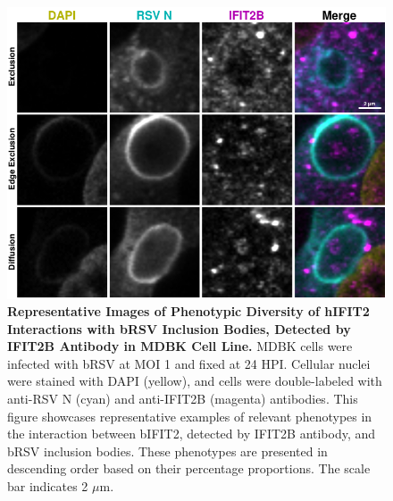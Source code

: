 \begin{figure}
    \centering
    \includegraphics[width=1\linewidth]{08. Chapter 3/Figs/02. Infection/02. IFIT2/02. IFIT2B/12. i2b mdbk brsv.pdf} 
    \caption[Representative Images of Phenotypic Diversity of hIFIT2 Interactions with bRSV Inclusion Bodies, Detected by IFIT2B Antibody in MDBK Cell Line.]{\textbf{Representative Images of Phenotypic Diversity of hIFIT2 Interactions with bRSV Inclusion Bodies, Detected by IFIT2B Antibody in MDBK Cell Line.} MDBK cells were infected with bRSV at MOI 1 and fixed at 24 HPI. Cellular nuclei were stained with DAPI (yellow), and cells were double-labeled with anti-RSV N (cyan) and anti-IFIT2B (magenta) antibodies. This figure showcases representative examples of relevant phenotypes in the interaction between bIFIT2, detected by IFIT2B antibody, and bRSV inclusion bodies. These phenotypes are presented in descending order based on their percentage proportions. The scale bar indicates 2 \(\mu \mbox{m}\).}
    \label{fig:Representative Images of Phenotypic Diversity of hIFIT2 Interactions with bRSV Inclusion Bodies, Detected by IFIT2B Antibody in MDBK Cell Line}
\end{figure}

